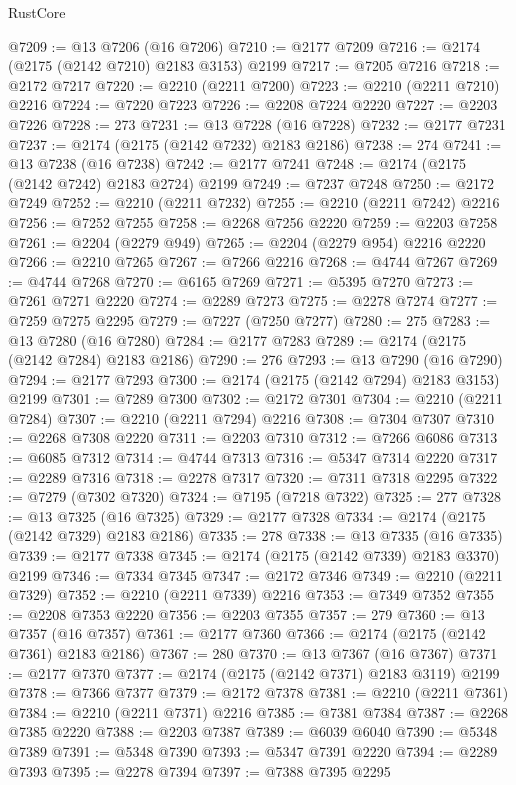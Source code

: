 \begin{lexlean}{RustCore}
\begin{coremodule}
@7209 := @13 @7206 (@16 @7206)
@7210 := @2177 @7209
@7216 := @2174 (@2175 (@2142 @7210) @2183 @3153) @2199
@7217 := @7205 @7216
@7218 := @2172 @7217
@7220 := @2210 (@2211 @7200)
@7223 := @2210 (@2211 @7210) @2216
@7224 := @7220 @7223
@7226 := @2208 @7224 @2220
@7227 := @2203 @7226
@7228 := 273
@7231 := @13 @7228 (@16 @7228)
@7232 := @2177 @7231
@7237 := @2174 (@2175 (@2142 @7232) @2183 @2186)
@7238 := 274
@7241 := @13 @7238 (@16 @7238)
@7242 := @2177 @7241
@7248 := @2174 (@2175 (@2142 @7242) @2183 @2724) @2199
@7249 := @7237 @7248
@7250 := @2172 @7249
@7252 := @2210 (@2211 @7232)
@7255 := @2210 (@2211 @7242) @2216
@7256 := @7252 @7255
@7258 := @2268 @7256 @2220
@7259 := @2203 @7258
@7261 := @2204 (@2279 @949)
@7265 := @2204 (@2279 @954) @2216 @2220
@7266 := @2210 @7265
@7267 := @7266 @2216
@7268 := @4744 @7267
@7269 := @4744 @7268
@7270 := @6165 @7269
@7271 := @5395 @7270
@7273 := @7261 @7271 @2220
@7274 := @2289 @7273
@7275 := @2278 @7274
@7277 := @7259 @7275 @2295
@7279 := @7227 (@7250 @7277)
@7280 := 275
@7283 := @13 @7280 (@16 @7280)
@7284 := @2177 @7283
@7289 := @2174 (@2175 (@2142 @7284) @2183 @2186)
@7290 := 276
@7293 := @13 @7290 (@16 @7290)
@7294 := @2177 @7293
@7300 := @2174 (@2175 (@2142 @7294) @2183 @3153) @2199
@7301 := @7289 @7300
@7302 := @2172 @7301
@7304 := @2210 (@2211 @7284)
@7307 := @2210 (@2211 @7294) @2216
@7308 := @7304 @7307
@7310 := @2268 @7308 @2220
@7311 := @2203 @7310
@7312 := @7266 @6086
@7313 := @6085 @7312
@7314 := @4744 @7313
@7316 := @5347 @7314 @2220
@7317 := @2289 @7316
@7318 := @2278 @7317
@7320 := @7311 @7318 @2295
@7322 := @7279 (@7302 @7320)
@7324 := @7195 (@7218 @7322)
@7325 := 277
@7328 := @13 @7325 (@16 @7325)
@7329 := @2177 @7328
@7334 := @2174 (@2175 (@2142 @7329) @2183 @2186)
@7335 := 278
@7338 := @13 @7335 (@16 @7335)
@7339 := @2177 @7338
@7345 := @2174 (@2175 (@2142 @7339) @2183 @3370) @2199
@7346 := @7334 @7345
@7347 := @2172 @7346
@7349 := @2210 (@2211 @7329)
@7352 := @2210 (@2211 @7339) @2216
@7353 := @7349 @7352
@7355 := @2208 @7353 @2220
@7356 := @2203 @7355
@7357 := 279
@7360 := @13 @7357 (@16 @7357)
@7361 := @2177 @7360
@7366 := @2174 (@2175 (@2142 @7361) @2183 @2186)
@7367 := 280
@7370 := @13 @7367 (@16 @7367)
@7371 := @2177 @7370
@7377 := @2174 (@2175 (@2142 @7371) @2183 @3119) @2199
@7378 := @7366 @7377
@7379 := @2172 @7378
@7381 := @2210 (@2211 @7361)
@7384 := @2210 (@2211 @7371) @2216
@7385 := @7381 @7384
@7387 := @2268 @7385 @2220
@7388 := @2203 @7387
@7389 := @6039 @6040
@7390 := @5348 @7389
@7391 := @5348 @7390
@7393 := @5347 @7391 @2220
@7394 := @2289 @7393
@7395 := @2278 @7394
@7397 := @7388 @7395 @2295

\end{coremodule}
\end{lexlean}
